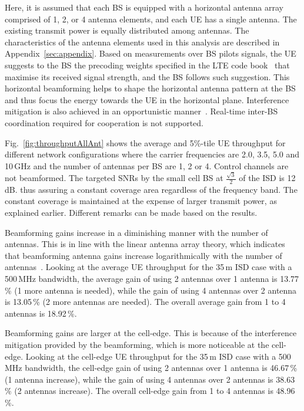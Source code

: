 \documentclass{IEEEtran}
\begin{document}
Here,
it is assumed that
each \ac{BS} is equipped with a horizontal antenna array comprised of 1, 2, or 4 antenna elements,
and each \ac{UE} has a single antenna.
The existing transmit power is equally distributed among antennas.
The characteristics of the antenna elements used in this analysis are described in Appendix~\ref{sec:appendix}.
Based on measurements over \ac{BS} pilots signals,
the \ac{UE} suggests to the \ac{BS} the precoding weights specified in the LTE code book~\cite{TS36211} that maximise its received signal strength,
and the \ac{BS} follows such suggestion.
This horizontal beamforming helps to shape the horizontal antenna pattern at the \ac{BS} and thus focus the energy towards the \ac{UE} in the horizontal plane.
Interference mitigation is also achieved in an opportunistic manner~\cite{Viswanath:02}.
Real-time inter-\ac{BS} coordination required for cooperation is not supported.

Fig.~\ref{fig:throughputAllAnt} shows the average and 5\%-tile UE throughput for different network configurations
where the carrier frequencies are 2.0, 3.5, 5.0 and 10\,GHz and the number of antennas per \ac{BS} are 1, 2 or 4.
Control channels are not beamformed.
The targeted \acp{SNR} by the small cell \ac{BS} at $\frac{\sqrt{3}}{2}$ of the \ac{ISD} is 12\,dB.
thus assuring a constant coverage area regardless of the frequency band.
The constant coverage is maintained at the expense of larger transmit power,
as explained earlier.
Different remarks can be made based on the results.

Beamforming gains increase in a diminishing manner with the number of antennas.
This is in line with the linear antenna array theory,
which indicates that beamforming antenna gains increase logarithmically with the number of antennas~\cite{antennaTheorybook}.
Looking at the average \ac{UE} throughput for the 35\,m \ac{ISD} case with a 500\,MHz bandwidth,
the average gain of using 2 antennas over 1 antenna is 13.77\,\% (1 more antenna is needed),
while the gain of using 4 antennas over 2 antenna is 13.05\,\% (2 more antennas are needed).
The overall average gain from 1 to 4 antennas is 18.92\,\%.



Beamforming gains are larger at the cell-edge.
This is because of the interference mitigation provided by the beamforming,
which is more noticeable at the cell-edge.
Looking at the cell-edge \ac{UE} throughput for the 35\,m \ac{ISD} case with a 500\,MHz bandwidth,
the cell-edge gain of using 2 antennas over 1 antenna is 46.67\,\% (1 antenna increase),
while the gain of using 4 antennas over 2 antennas is 38.63\,\% (2 antennas increase).
The overall cell-edge gain from 1 to 4 antennas is 48.96\,\%.
\end{document}
